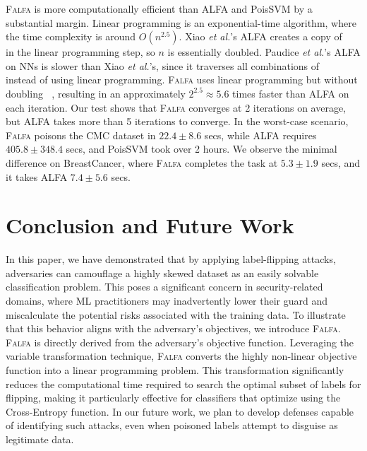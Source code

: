 \documentclass[runningheads]{llncs}
\newcommand{\falfa}{\textsc{Falfa}\xspace}
\DeclareMathOperator*{\ytr}{\mathcal{Y}_\text{train}}
\begin{document}
\falfa is more computationally efficient than ALFA and PoisSVM by a substantial margin.
Linear programming is an exponential-time algorithm, where the time complexity is around $O(n^{2.5})$.
Xiao {\em et al.}'s ALFA creates a copy of $\ytr$ in the linear programming step, so $n$ is essentially doubled.
Paudice {\em et al.}'s ALFA on NNs is slower than Xiao {\em et al.}'s, since it traverses all combinations of $\ytr$ instead of using linear programming.
\falfa uses linear programming but without doubling $\ytr$, resulting in an approximately $2^{2.5}\approx5.6$ times faster than ALFA on each iteration.
Our test shows that \falfa converges at 2 iterations on average, but ALFA takes more than 5 iterations to converge.
In the worst-case scenario, \falfa poisons the CMC dataset in $22.4\pm8.6$ secs, while ALFA requires $405.8\pm348.4$ secs, and PoisSVM took over 2 hours.
We observe the minimal difference on BreastCancer, where \falfa completes the task at $5.3\pm1.9$ secs, and it takes ALFA $7.4\pm5.6$ secs.


\section{Conclusion and Future Work}
\label{sec:conclusion}

In this paper, we have demonstrated that by applying label-flipping attacks, adversaries can camouflage a highly skewed dataset as an easily solvable classification problem. 
This poses a significant concern in security-related domains, where ML practitioners may inadvertently lower their guard and miscalculate the potential risks associated with the training data.
To illustrate that this behavior aligns with the adversary's objectives, we introduce \falfa.
\falfa is directly derived from the adversary's objective function. 
Leveraging the variable transformation technique, \falfa converts the highly non-linear objective function into a linear programming problem. 
This transformation significantly reduces the computational time required to search the optimal subset of labels for flipping, making it particularly effective for classifiers that optimize using the Cross-Entropy function.
In our future work, we plan to develop defenses capable of identifying such attacks, even when poisoned labels attempt to disguise as legitimate data.




\end{document}
